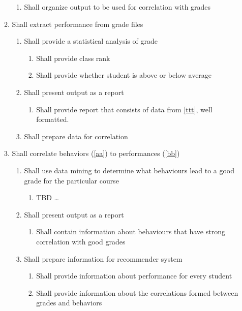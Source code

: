 \documentclass[12pt]{article}
\begin{document}
\begin{enumerate}[label = 3.\arabic*,itemsep=-1mm]
\begin{enumerate}[label* = .\arabic*, itemsep=-1mm]
\begin{enumerate}[label* = .\arabic*, itemsep=-1mm]
				\item Shall organize output to be used for correlation with grades
			\end{enumerate}
			\item Shall extract performance from grade files \label{bb}
			\begin{enumerate}[label* = .\arabic*, itemsep=-1mm] 
				\item Shall provide a statistical analysis of grade
				\begin{enumerate}[label* = .\arabic*, itemsep=-1mm]  \label{ttt}
					\item Shall provide class rank
					\item Shall provide whether student is above or below average
				\end{enumerate}
				\item Shall present output as a report
				\begin{enumerate}[label* = .\arabic*, itemsep=-1mm] 
					\item Shall provide report that consists of data from \ref{ttt}, well formatted.
				\end{enumerate}
				\item Shall prepare data for correlation
			\end{enumerate}
			\item Shall correlate behaviors (\ref{aa}) to performances (\ref{bb})
			\begin{enumerate}[label* = .\arabic*, itemsep=-1mm]
				\item Shall use data mining to determine what behaviours lead to a good grade for the particular course
				\begin{enumerate}[label* = .\arabic*, itemsep=-1mm]
					\item TBD \dots
				\end{enumerate}
				\item Shall present output as a report
				\begin{enumerate}[label* = .\arabic*, itemsep=-1mm]
					\item Shall contain information about behaviours that have strong correlation with good grades
				\end{enumerate}
				\item Shall prepare information for recommender system
				\begin{enumerate}[label* = .\arabic*, itemsep=-1mm]
					\item Shall provide information about performance for every student
					\item Shall provide information about the correlations formed between grades and behaviors

\end{enumerate}
\end{enumerate}
\end{enumerate}
\end{enumerate}
\end{document}
